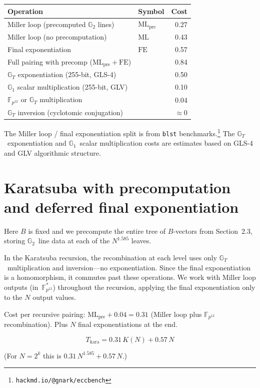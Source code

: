 \documentclass[11pt]{article}
\newcommand{\Gt}{\mathbb{G}_T}
\newcommand{\Gone}{\mathbb{G}_1}
\newcommand{\Gtwo}{\mathbb{G}_2}
\newcommand{\Fpk}{\mathbb{F}_{p^{12}}}
\newcommand{\MLpre}{\mathrm{ML_{pre}}}
\newcommand{\FE}{\mathrm{FE}}
\theoremstyle{plain}
\theoremstyle{remark}
\begin{document}
\begin{center}
\begin{tabular}{llr}
\toprule
\textbf{Operation} & \textbf{Symbol} & \textbf{Cost} \\
\midrule
Miller loop (precomputed $\Gtwo$ lines) & $\MLpre$ & 0.27 \\
Miller loop (no precomputation) & $\mathrm{ML}$ & 0.43 \\
Final exponentiation & $\FE$ & 0.57 \\
Full pairing with precomp ($\MLpre + \FE$) & & 0.84 \\
$\Gt$ exponentiation (255-bit, GLS-4) & & 0.50 \\
$\Gone$ scalar multiplication (255-bit, GLV) & & 0.10 \\
$\Fpk$ or $\Gt$ multiplication & & 0.04 \\
$\Gt$ inversion (cyclotomic conjugation) & & $\approx 0$ \\
\bottomrule
\end{tabular}
\end{center}

\noindent
The Miller loop / final exponentiation split
is from \texttt{blst} benchmarks.\footnote{%
\texttt{hackmd.io/@gnark/eccbench}}
The $\Gt$~exponentiation and $\Gone$~scalar multiplication costs
are estimates based on
GLS-4 and GLV algorithmic structure.

\section{Karatsuba with precomputation and deferred final exponentiation}

Here $B$ is fixed and we precompute
the entire tree of $B$-vectors from Section~2.3,
storing $\Gtwo$~line data at each of the $N^{1.585}$ leaves.

In the Karatsuba recursion, the recombination at each level
uses only $\Gt$~multiplication and inversion---no exponentiation.
Since the final exponentiation is a homomorphism,
it commutes past these operations.
We work with Miller loop outputs
(in~$\Fpk^*$) throughout the recursion,
applying the final exponentiation
only to the $N$ output values.

Cost per recursive pairing:
$\MLpre + 0.04 = 0.31$
(Miller loop plus $\Fpk$ recombination).
Plus $N$ final exponentiations at the end.

\[
\boxed{T_{\mathrm{kara}} = 0.31\,K(N) + 0.57\,N}
\]

\noindent
(For $N = 2^k$ this is $0.31\,N^{1.585} + 0.57\,N$.)
\end{document}

